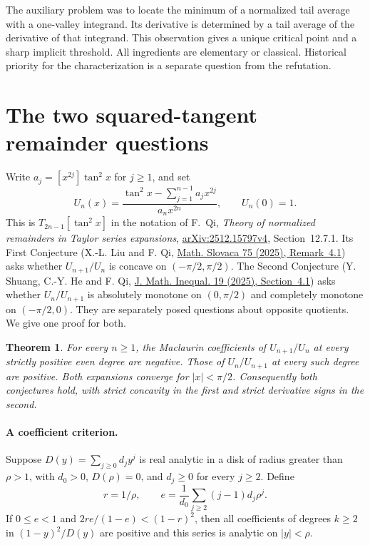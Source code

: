 \documentclass[11pt,a4paper]{article}
\newtheorem{theorem}{Theorem}[section]
\numberwithin{equation}{section}
\begin{document}
The auxiliary problem was to locate the minimum of a normalized
tail average with a one-valley integrand. Its derivative is determined
by a tail average of the derivative of that integrand. This observation
gives a unique critical point and a sharp implicit threshold. All
ingredients are elementary or classical. Historical priority for
the characterization is a separate question from the refutation.


\section{The two squared-tangent remainder questions}
\label{sec:tan-tails}

Write $a_j=[x^{2j}]\tan^2 x$ for $j\ge1$, and set
\[
  U_n(x)=\frac{\tan^2x-\sum_{j=1}^{n-1}a_jx^{2j}}{a_nx^{2n}},
  \qquad U_n(0)=1.
\]
This is $T_{2n-1}[\tan^2 x]$ in the notation of F.~Qi,
\emph{Theory of normalized remainders in Taylor series expansions},
\href{https://arxiv.org/abs/2512.15797}{arXiv:2512.15797v4},
Section~12.7.1. Its First Conjecture (X.-L. Liu and F. Qi,
\href{https://doi.org/10.1515/ms-2025-0051}{Math. Slovaca 75 (2025),
Remark~4.1}) asks whether $U_{n+1}/U_n$ is concave on
$(-\pi/2,\pi/2)$. The Second Conjecture (Y. Shuang, C.-Y. He and
F. Qi, \href{https://doi.org/10.7153/jmi-2025-19-80}{J. Math.
Inequal. 19 (2025), Section~4.1}) asks whether $U_n/U_{n+1}$ is
absolutely monotone on $(0,\pi/2)$ and completely monotone on
$(-\pi/2,0)$. They are separately posed questions about opposite
quotients. We give one proof for both.

\begin{theorem}\label{th:tanpaired}
For every $n\ge1$, the Maclaurin coefficients of $U_{n+1}/U_n$
at every strictly positive even degree are negative. Those of
$U_n/U_{n+1}$ at every such degree are positive. Both expansions
converge for $|x|<\pi/2$. Consequently both conjectures hold,
with strict concavity in the first and strict derivative signs in
the second.
\end{theorem}

\paragraph{A coefficient criterion.}
Suppose $D(y)=\sum_{j\ge0}d_j y^j$ is real analytic in a disk
of radius greater than $\rho>1$, with $d_0>0$, $D(\rho)=0$, and
$d_j\ge0$ for every $j\ge2$. Define
\[
 r=1/\rho,\qquad
 e=\frac{1}{d_0}\sum_{j\ge2}(j-1)d_j\rho^j.
\]
If $0\le e<1$ and $2r e/(1-e)<(1-r)^2$, then all coefficients
of degrees $k\ge2$ in $(1-y)^2/D(y)$ are positive and this series
is analytic on $|y|<\rho$.
\end{document}
